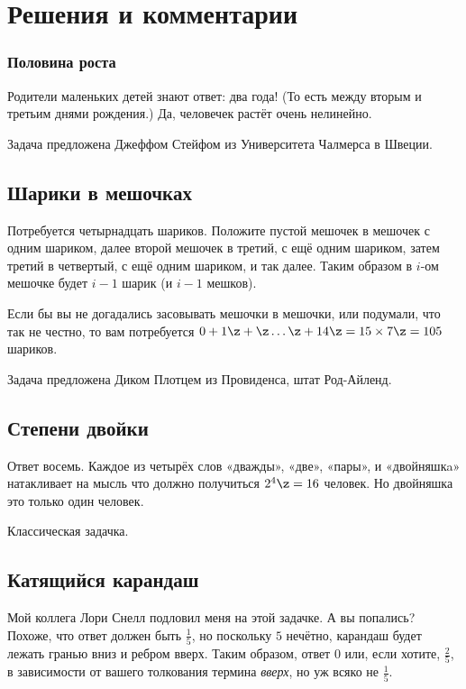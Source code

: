 \section*{Решения и комментарии}

\subsubsection*{Половина роста}

Родители маленьких детей знают ответ: два года!
(То есть между вторым и третьим днями рождения.)
Да, человечек растёт очень нелинейно.

Задача предложена Джеффом Стейфом из Университета Чалмерса в Швеции.

\subsection*{Шарики в мешочках}

Потребуется четырнадцать шариков.
Положите пустой мешочек в мешочек с одним шариком, 
далее второй мешочек в третий, с ещё одним шариком, затем третий в четвертый, с ещё одним шариком, и так далее.
Таким образом в $i$-ом мешочке будет $i-1$ шарик (и $i-1$ мешков).

Если бы вы не догадались засовывать мешочки в мешочки, или подумали, что так не честно, то вам потребуется $0 + 1 \z+ \z\dots \z+ 14 \z= 15 \times 7 \z= 105$ шариков.

Задача предложена Диком Плотцем из Провиденса, штат Род-Айленд.

\subsection*{Степени двойки}

Ответ восемь.
Каждое из четырёх слов «дважды», «две», «пары», и «двойняшкa» натакливает на мысль что должно получиться $2^4 \z= 16$ человек.
Но двойняшка это только один человек.

Классическая задачка.

\subsection*{Катящийся карандаш}

Мой коллега Лори Снелл подловил меня на этой задачке.
А вы попались?
Похоже, что ответ должен быть $\tfrac15$, но поскольку $5$ нечётно, карандаш будет лежать гранью вниз и ребром вверх.
Таким образом, ответ $0$ или, если хотите, $\tfrac25$, в зависимости от вашего толкования термина \emph{вверх}, но уж всяко не $\tfrac15$.

